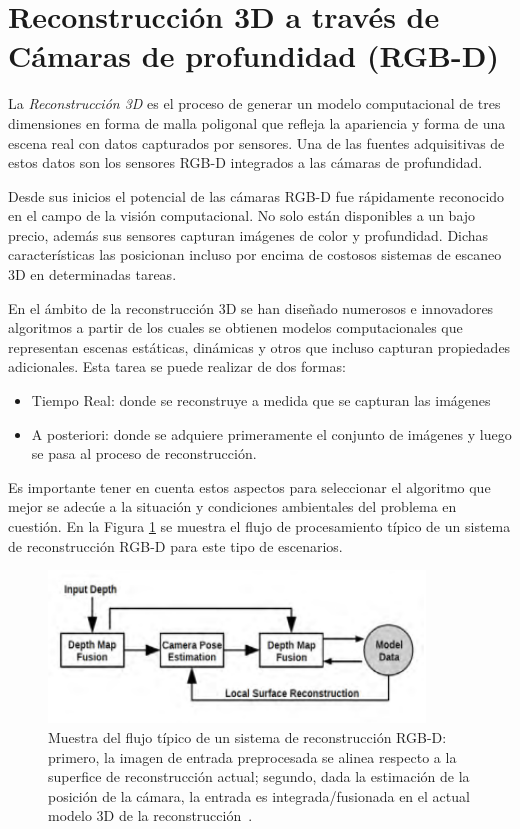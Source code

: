 \section{Reconstrucción 3D a través de Cámaras de profundidad  (RGB-D)}\label{section:rec3d}

La \textit{Reconstrucción 3D} es el proceso de generar un modelo computacional de tres dimensiones en forma de malla poligonal que refleja la apariencia y forma de una escena real con datos capturados por sensores. Una de las fuentes adquisitivas de estos datos son los sensores RGB-D integrados a las cámaras de profundidad.

Desde sus inicios el potencial de las cámaras RGB-D fue rápidamente reconocido en el campo de la visión computacional. No solo están disponibles a un bajo precio, además sus sensores capturan imágenes de color y profundidad. Dichas características las posicionan incluso por encima de costosos sistemas de escaneo 3D en determinadas tareas.

En el ámbito de la reconstrucción 3D se han diseñado numerosos e innovadores algoritmos a partir de los cuales se obtienen modelos computacionales que representan escenas estáticas, dinámicas y otros que incluso capturan propiedades adicionales. Esta tarea se puede realizar de dos formas:

\begin{itemize}
	\item Tiempo Real: donde se reconstruye  a medida que se capturan las imágenes
	\item A posteriori: donde se adquiere primeramente el conjunto de imágenes y luego se pasa al proceso de reconstrucción.
\end{itemize}

Es importante tener en cuenta estos aspectos para seleccionar el algoritmo que mejor se adecúe a la situación y condiciones ambientales del problema en cuestión. En la Figura \ref{fig:r3d} se muestra el flujo de procesamiento típico de un sistema de reconstrucción RGB-D para este tipo de escenarios.

\begin{figure}[ht]
	\centering
	\includegraphics[width=10cm]{./Graphics/r3d.png}
	\caption{Muestra del flujo típico de un sistema de reconstrucción RGB-D: primero, la imagen de entrada preprocesada se alinea respecto a la superfice de reconstrucción actual; segundo, dada la estimación de la posición de la cámara, la entrada es integrada/fusionada en el actual modelo 3D de la reconstrucción~\cite{zollhofer2018state}.}
	\label{fig:r3d}
\end{figure}


